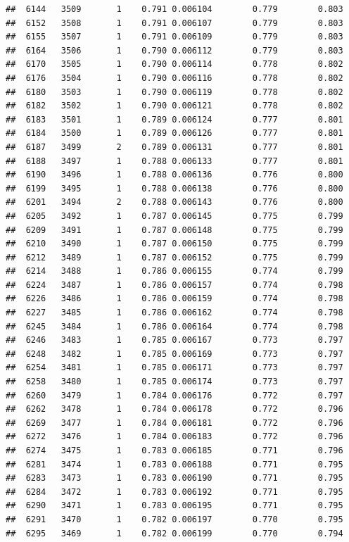 \documentclass[
]{book}
\begin{document}
\begin{verbatim}
##  6144   3509       1    0.791 0.006104        0.779        0.803
##  6152   3508       1    0.791 0.006107        0.779        0.803
##  6155   3507       1    0.791 0.006109        0.779        0.803
##  6164   3506       1    0.790 0.006112        0.779        0.803
##  6170   3505       1    0.790 0.006114        0.778        0.802
##  6176   3504       1    0.790 0.006116        0.778        0.802
##  6180   3503       1    0.790 0.006119        0.778        0.802
##  6182   3502       1    0.790 0.006121        0.778        0.802
##  6183   3501       1    0.789 0.006124        0.777        0.801
##  6184   3500       1    0.789 0.006126        0.777        0.801
##  6187   3499       2    0.789 0.006131        0.777        0.801
##  6188   3497       1    0.788 0.006133        0.777        0.801
##  6190   3496       1    0.788 0.006136        0.776        0.800
##  6199   3495       1    0.788 0.006138        0.776        0.800
##  6201   3494       2    0.788 0.006143        0.776        0.800
##  6205   3492       1    0.787 0.006145        0.775        0.799
##  6209   3491       1    0.787 0.006148        0.775        0.799
##  6210   3490       1    0.787 0.006150        0.775        0.799
##  6212   3489       1    0.787 0.006152        0.775        0.799
##  6214   3488       1    0.786 0.006155        0.774        0.799
##  6224   3487       1    0.786 0.006157        0.774        0.798
##  6226   3486       1    0.786 0.006159        0.774        0.798
##  6227   3485       1    0.786 0.006162        0.774        0.798
##  6245   3484       1    0.786 0.006164        0.774        0.798
##  6246   3483       1    0.785 0.006167        0.773        0.797
##  6248   3482       1    0.785 0.006169        0.773        0.797
##  6254   3481       1    0.785 0.006171        0.773        0.797
##  6258   3480       1    0.785 0.006174        0.773        0.797
##  6260   3479       1    0.784 0.006176        0.772        0.797
##  6262   3478       1    0.784 0.006178        0.772        0.796
##  6269   3477       1    0.784 0.006181        0.772        0.796
##  6272   3476       1    0.784 0.006183        0.772        0.796
##  6274   3475       1    0.783 0.006185        0.771        0.796
##  6281   3474       1    0.783 0.006188        0.771        0.795
##  6283   3473       1    0.783 0.006190        0.771        0.795
##  6284   3472       1    0.783 0.006192        0.771        0.795
##  6290   3471       1    0.783 0.006195        0.771        0.795
##  6291   3470       1    0.782 0.006197        0.770        0.795
##  6295   3469       1    0.782 0.006199        0.770        0.794

\end{verbatim}
\end{document}
